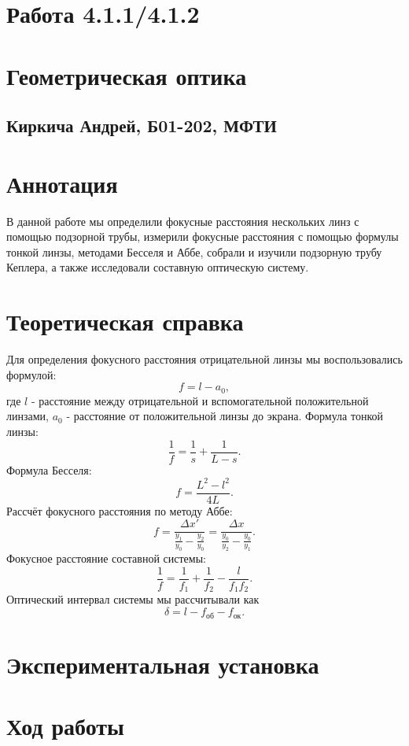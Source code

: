 


\section*{Работа 4.1.1/4.1.2}	
\section*{Геометрическая оптика}
\subsection*{Киркича Андрей, Б01-202, МФТИ}

\section*{Аннотация}
В данной работе мы определили фокусные расстояния нескольких линз с помощью подзорной трубы, измерили фокусные расстояния с помощью формулы тонкой линзы, методами Бесселя и Аббе, собрали и изучили подзорную трубу Кеплера, а также исследовали составную оптическую систему.
\section*{Теоретическая справка}
Для определения фокусного расстояния отрицательной линзы мы воспользовались формулой:
\[f = l - a_0,\]
где $l$ - расстояние между отрицательной и вспомогательной положительной линзами, $a_0$ - расстояние от положительной линзы до экрана.
\n\n
Формула тонкой линзы:
\[\frac{1}{f} = \frac{1}{s} + \frac{1}{L-s}.\]
\n
Формула Бесселя:
\[f = \frac{L^2-l^2}{4L}.\]
\n
Рассчёт фокусного расстояния по методу Аббе:
\[f = \frac{\Delta x'}{\frac{y_1}{y_0} - \frac{y_2}{y_0}} = \frac{\Delta x}{\frac{y_0}{y_2} - \frac{y_0}{y_1}}.\]
\n
Фокусное расстояние составной системы:
\[\frac{1}{f} = \frac{1}{f_1} + \frac{1}{f_2} - \frac{l}{f_1 f_2}.\]
\n
Оптический интервал системы мы рассчитывали как
\[\delta = l - f_{\text{об}} - f_{\text{ок}}.\]
\section*{Экспериментальная установка}
\section*{Ход работы}
